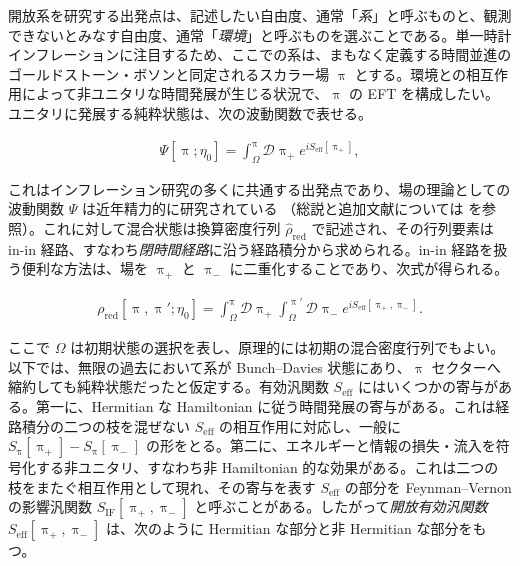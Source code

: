 \documentclass[a4paper,11pt]{ltjsarticle}
\numberwithin{equation}{section}
\newcommand{\ee}{e}
\begin{document}
開放系を研究する出発点は、記述したい自由度、通常「\textit{系}」と呼ぶものと、観測できないとみなす自由度、通常「\textit{環境}」と呼ぶものを選ぶことである。単一時計インフレーションに注目するため、ここでの系は、まもなく定義する時間並進のゴールドストーン・ボソンと同定されるスカラー場 $\uppi$ とする。環境との相互作用によって非ユニタリな時間発展が生じる状況で、$\uppi$ の EFT を構成したい。ユニタリに発展する純粋状態は、次の波動関数で表せる。

\begin{align}
\Psi\left[\uppi; \eta_0 \right] = \int_{\Omega}^{\uppi} \mathcal{D} \uppi_+ \ee^{i S_{\mathrm{eff}}\left[ \uppi_+\right]},
\end{align}

これはインフレーション研究の多くに共通する出発点であり、場の理論としての波動関数 $\Psi$ は近年精力的に研究されている \cite{Anninos:2014lwa,Arkani-Hamed:2017fdk,Arkani-Hamed:2018kmz,Pajer:2020wnj,Goodhew:2020hob,Cespedes:2020xqq,Goodhew:2021oqg,Melville:2021lst,Salcedo:2022aal,Baumann:2021fxj,Albayrak:2023hie,Stefanyszyn:2023qov,Sleight:2021plv,Celoria:2021vjw,Creminelli:2024cge,Chakraborty:2023yed}（総説と追加文献については \cite{Baumann:2022jpr,Benincasa:2022gtd} を参照）。これに対して混合状態は換算密度行列 $\widehat{\rho}_{\mathrm{red}}$ で記述され、その行列要素は in-in 経路、すなわち\textit{閉時間経路}に沿う経路積分から求められる。in-in 経路を扱う便利な方法は、場を $\uppi_+$ と $\uppi_-$ に二重化することであり、次式が得られる。

\begin{align}
\rho_{\mathrm{red}}\left[\uppi, \uppi';\eta_0\right] = \int_{\Omega}^\uppi \mathcal{D}\uppi_+ \int_{\Omega}^{\uppi'} \mathcal{D}\uppi_- \ee^{i S_{\mathrm{eff}}\left[ \uppi_+, \uppi_-\right]}.\label{eq:densitymatrix}
\end{align}

ここで $\Omega$ は初期状態の選択を表し、原理的には初期の混合密度行列でもよい。以下では、無限の過去において系が Bunch--Davies 状態にあり、$\uppi$ セクターへ縮約しても純粋状態だったと仮定する。有効汎関数 $S_{\mathrm{eff}}$ にはいくつかの寄与がある。第一に、Hermitian な Hamiltonian に従う時間発展の寄与がある。これは経路積分の二つの枝を混ぜない $S_{\mathrm{eff}}$ の相互作用に対応し、一般に $S_\uppi[\uppi_+]-S_\uppi[\uppi_-]$ の形をとる。第二に、エネルギーと情報の損失・流入を符号化する非ユニタリ、すなわち非 Hamiltonian 的な効果がある。これは二つの枝をまたぐ相互作用として現れ、その寄与を表す $S_{\mathrm{eff}}$ の部分を Feynman--Vernon の影響汎関数 $S_{\mathrm{IF}}[\uppi_+,\uppi_-]$ と呼ぶことがある。したがって\textit{開放有効汎関数} $S_{\mathrm{eff}}[\uppi_+,\uppi_-]$ は、次のように Hermitian な部分と非 Hermitian な部分をもつ。
\end{document}
